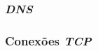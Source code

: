 \documentclass[a4paper]{article}
\begin{document}
	\subsubsection{\textit{DNS}}
	\subsubsection{Conexões \textit{TCP}}

	
\end{document}
